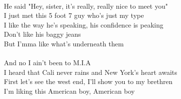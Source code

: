 \\
He said "Hey, sister, it's really, really nice to meet you" \\
I just met this 5 foot 7 guy who's just my type \\
I like the way he's speaking, his confidence is peaking \\
Don't like his baggy jeans \\
But I'mma like what's underneath them \\
\\
And no I ain't been to M.I.A \\
I heard that Cali never rains and New York's heart awaits \\
First let's see the west end, I'll show you to my brethren \\
I'm liking this American boy, American boy \\
\\
